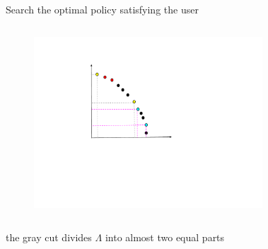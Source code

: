 \documentclass{beamer}
\begin{document}
\begin{frame}{Search the optimal policy satisfying the user}
\begin{columns}
\begin{figure}
\centering
\includegraphics[width=1.\textwidth]{figures/which-pair}
\end{figure}
%
\begin{figure}
\centering
\end{figure}
\end{columns}
\centering
{\small the gray cut divides $\Lambda$ into almost two equal parts}
\end{frame}
\end{document}
